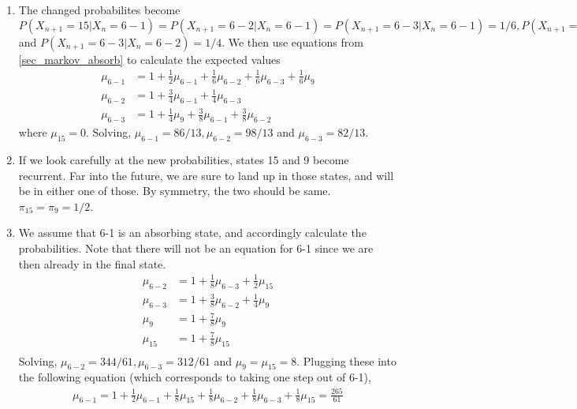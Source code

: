 \documentclass[../probability-notes.tex]{subfiles}
\begin{document}
\begin{enumerate}
\begin{enumerate}
            \item The changed probabilites become $P(X_{n+1}=15|X_{n}=6-1) = P(X_{n+1}=6-2|X_{n}=6-1) = P(X_{n+1}=6-3|X_{n}=6-1) = 1/6, P(X_{n+1}=6-1|X_{n}=6-2)=3/4$ and $P(X_{n+1}=6-3|X_{n}=6-2)=1/4$. We then use equations from \ref{sec_markov_absorb} to calculate the expected values
            \begin{align*}
                \mu_{6-1} &= 1 + \frac{1}{2}\mu_{6-1} + \frac{1}{6} \mu_{6-2} + \frac{1}{6} \mu_{6-3} + \frac{1}{6}\mu_{9}\\
                \mu_{6-2} &= 1 + \frac{3}{4}\mu_{6-1} + \frac{1}{4}\mu_{6-3}\\
                \mu_{6-3} &= 1 + \frac{1}{4}\mu_{9} + \frac{3}{8}\mu_{6-1} + \frac{3}{8}\mu_{6-2}
            \end{align*}
            where $\mu_{15} = 0$. Solving, $\mu_{6-1} = 86/13, \mu_{6-2} = 98/13$ and $\mu_{6-3} = 82/13$.

            \item If we look carefully at the new probabilities, states 15 and 9 become recurrent. Far into the future, we are sure to land up in those states, and will be in either one of those. By symmetry, the two should be same. $\pi_{15} = \pi_{9} = 1/2$.

            \item We assume that 6-1 is an absorbing state, and accordingly calculate the probabilities. Note that there will not be an equation for 6-1 since we are then already in the final state.
            \begin{align*}
                \mu_{6-2} &= 1 + \frac{1}{8} \mu_{6-3} + \frac{1}{2} \mu_{15}\\
                \mu_{6-3} &= 1 + \frac{3}{8} \mu_{6-2} + \frac{1}{4} \mu_{9}\\
                \mu_{9} &= 1 + \frac{7}{8} \mu_{9}\\
                \mu_{15} &= 1 + \frac{7}{8} \mu_{15}\\
            \end{align*}
            Solving, $\mu_{6-2} = 344/61, \mu_{6-3} = 312/61$ and $\mu_{9} = \mu_{15} = 8$. Plugging these into the following equation (which corresponds to taking one step out of 6-1),
            \begin{align*}
                \mu_{6-1} = 1 + \frac{1}{2} \mu_{6-1} + \frac{1}{8} \mu_{15} + \frac{1}{8} \mu_{6-2} + \frac{1}{8} \mu_{6-3} + \frac{1}{8} \mu_{15} = \frac{265}{61}
            \end{align*}
        \end{enumerate}



\end{enumerate}
\end{document}
